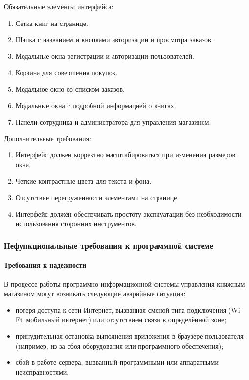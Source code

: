 Обязательные элементы интерфейса:
\begin{enumerate}
	\item Сетка книг на странице.
	\item Шапка с названием и кнопками авторизации и просмотра заказов.		
	\item Модальные окна регистрации и авторизации пользователей.	
	\item Корзина для совершения покупок.	
	\item Модальное окно со списком заказов.
	\item Модальные окна с подробной информацией о книгах.
	\item Панели сотрудника и администратора для управления магазином.
\end{enumerate}
Дополнительные требования:
\begin{enumerate}
	\item Интерфейс должен корректно масштабироваться при изменении размеров окна.	
	\item Четкие контрастные цвета для текста и фона.
	\item Отсутствие перегруженности элементами на странице.
	\item Интерфейс должен обеспечивать простоту эксплуатации без необходимости использования сторонних инструментов.
\end{enumerate}

\subsubsection{Нефункциональные требования к программной системе}

\paragraph{Требования к надежности}

В процессе работы программно-информационной системы управления книжным магазином могут возникать следующие аварийные ситуации:

\begin{itemize}
	\item потеря доступа к сети Интернет, вызванная сменой типа подключения (Wi-Fi, мобильный интернет) или отсутствием связи в определённой зоне;
	\item принудительная остановка выполнения приложения в браузере пользователя (например, из-за сбоя оборудования или программного обеспечения);
	\item сбой в работе сервера, вызванный программными или аппаратными неисправностями.
\end{itemize}

